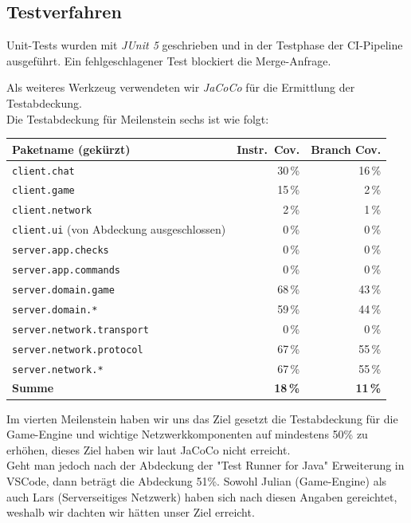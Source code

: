 \documentclass{article}
\begin{document}
\newpage
\subsection{Testverfahren}
Unit-Tests wurden mit \textit{JUnit 5} geschrieben und in der Testphase der CI-Pipeline ausgeführt. Ein fehlgeschlagener Test blockiert die Merge-Anfrage.

Als weiteres Werkzeug verwendeten wir \textit{JaCoCo} für die Ermittlung der Testabdeckung. \\
Die Testabdeckung für Meilenstein sechs ist wie folgt:

\begin{table}[H]
  \centering
  \renewcommand{\arraystretch}{1.4}
  \begin{tabular}{L{7.5cm} r r}
    \textbf{Paketname (gekürzt)}        & \textbf{Instr.\ Cov.} & \textbf{Branch Cov.} \\
    \midrule
    \texttt{client.chat}                                & 30\,\%  & 16\,\% \\
    \texttt{client.game}                                & 15\,\%  & 2\,\% \\
    \texttt{client.network}                             & 2\,\%  & 1\,\% \\
    \texttt{client.ui} (von Abdeckung ausgeschlossen)   & 0\,\%  & 0\,\% \\
    \texttt{server.app.checks}                          & 0\,\%  & 0\,\% \\
    \texttt{server.app.commands}                        & 0\,\%  & 0\,\% \\
    \texttt{server.domain.game}                         & 68\,\%  & 43\,\% \\
    \texttt{server.domain.*}                            & 59\,\%  & 44\,\% \\
    \texttt{server.network.transport}                   & 0\,\%  & 0\,\% \\
    \texttt{server.network.protocol}                    & 67\,\%  & 55\,\% \\
    \texttt{server.network.*}                           & 67\,\%  & 55\,\% \\
    \midrule
    \textbf{Summe}                          & \textbf{18\,\%} & \textbf{11\,\%} \\
    \bottomrule
  \end{tabular}
\end{table}

Im vierten Meilenstein haben wir uns das Ziel gesetzt die Testabdeckung für die Game-Engine und wichtige Netzwerkkomponenten auf mindestens 50\% zu erhöhen, dieses Ziel haben wir laut JaCoCo nicht erreicht.\\
Geht man jedoch nach der Abdeckung der "Test Runner for Java" Erweiterung in VSCode, dann beträgt die Abdeckung 51\%. Sowohl Julian (Game-Engine) als auch Lars (Serverseitiges Netzwerk) haben sich nach diesen Angaben gereichtet, weshalb wir dachten wir hätten unser Ziel erreicht.
\end{document}
